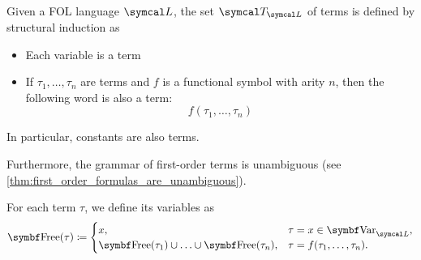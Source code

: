 \begin{definition}\label{def:first_order_term}\cite[definition 2.2]{Nerode2012}
  Given a FOL language \( \Cal{L} \), the set \( \Cal{T}_{\Cal{L}} \) of terms is defined by structural induction as
  \begin{itemize}
    \item Each variable is a term
    \item If \( \tau_1, \ldots, \tau_n \) are terms and \( f \) is a functional symbol with arity \( n \), then the following word is also a term:
    \begin{equation*}
      f(\tau_1, \ldots, \tau_n)
    \end{equation*}
  \end{itemize}

  In particular, constants are also terms.

  Furthermore, the grammar of first-order terms is unambiguous (see \cref{thm:first_order_formulas_are_unambiguous}).

  For each term \( \tau \), we define its variables as
  \begin{align*}
    \Bold{Free}(\tau) \coloneqq \begin{cases}
      x,                                                        &\tau = x \in \Bold{Var}_{\Cal{L}}, \\
      \Bold{Free}(\tau_1) \cup \ldots \cup \Bold{Free}(\tau_n), &\tau = f(\tau_1, \ldots, \tau_n).
    \end{cases}
  \end{align*}
\end{definition}

